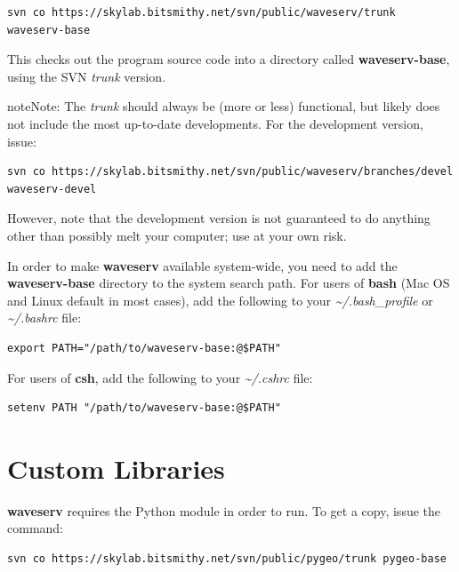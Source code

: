 \documentclass[letterpaper,10pt,english]{sphinxmanual}
\begin{document}
\begin{Verbatim}[commandchars=@\[\]]
svn co https://skylab.bitsmithy.net/svn/public/waveserv/trunk waveserv-base
\end{Verbatim}

This checks out the program source code into a directory called \textbf{waveserv-base}, using the SVN \emph{trunk} version.

\begin{notice}{note}{Note:}
The \emph{trunk} should always be (more or less) functional, but likely does not include the most up-to-date developments.  For the development version, issue:

\begin{Verbatim}[commandchars=@\[\]]
svn co https://skylab.bitsmithy.net/svn/public/waveserv/branches/devel waveserv-devel
\end{Verbatim}

However, note that the development version is not guaranteed to do anything other than possibly melt your computer; use at your own risk.
\end{notice}

In order to make \textbf{waveserv} available system-wide, you need to add the \textbf{waveserv-base} directory to the system search path.  For users of \textbf{bash} (Mac OS and Linux default in most cases), add the following to your \emph{\textasciitilde{}/.bash\_profile} or \emph{\textasciitilde{}/.bashrc} file:

\begin{Verbatim}[commandchars=@\[\]]
export PATH="/path/to/waveserv-base:@$PATH"
\end{Verbatim}

For users of \textbf{csh}, add the following to your \emph{\textasciitilde{}/.cshrc} file:

\begin{Verbatim}[commandchars=@\[\]]
setenv PATH "/path/to/waveserv-base:@$PATH"
\end{Verbatim}


\section{Custom Libraries}
\label{installation:custom-libraries}
\textbf{waveserv} requires the  Python module in order to run.  To get a copy, issue the command:

\begin{Verbatim}[commandchars=@\[\]]
svn co https://skylab.bitsmithy.net/svn/public/pygeo/trunk pygeo-base
\end{Verbatim}
\end{document}
